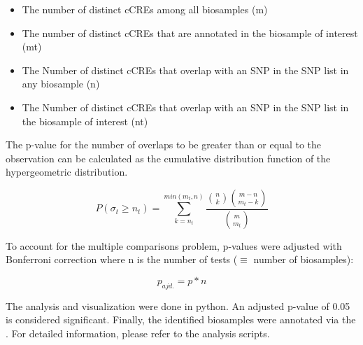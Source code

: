 \begin{itemize}
    \item The number of distinct cCREs among all biosamples (m)
    \item The number of distinct cCREs that are annotated in the biosample of interest (mt)
    \item The Number of distinct cCREs that overlap with an SNP in the SNP list in any biosample (n)
    \item The Number of distinct cCREs that overlap with an SNP in the SNP list in the biosample of interest (nt)
\end{itemize}

The p-value for the number of overlaps to be greater than or equal to the observation can be calculated as the cumulative distribution function of the hypergeometric distribution.

$$ P(\sigma_t\geq n_t) = \sum_{k=n_t}^{min(m_t, n)} \frac{\binom{n}{k}\binom{m-n}{m_t-k}}{\binom{m}{m_t}} $$

To account for the multiple comparisons problem, p-values were adjusted with Bonferroni correction where n is the number of tests ($\equiv$ number of biosamples):

$$ p_{ajd.} = p*n$$

The analysis and visualization were done in python. An adjusted p-value of 0.05 is considered significant. Finally, the identified biosamples were annotated via the . For detailed information, please refer to the analysis scripts.

